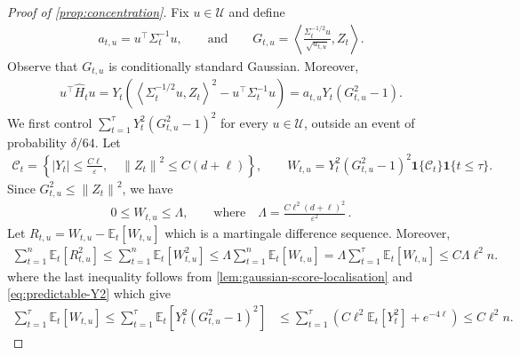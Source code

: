 \documentclass[11pt]{article}
\newcommand{\E}{\mathbb E}
\newcommand{\1}{\mathbf 1}
\newcommand{\eps}{\varepsilon}
\newcommand{\ip}[2]{\left\langle #1,#2\right\rangle}
\newcommand{\norm}[1]{\left\lVert #1\right\rVert}
\begin{document}
\begin{proof}[Proof of \cref{prop:concentration}]
    Fix $u\in\mathcal U$ and define
    \begin{align}
        a_{t,u}
        =
        u^\top\Sigma_t^{-1}u,
        \qquad\text{and}\qquad
        G_{t,u}
        =
        \ip{
            \frac{
                \Sigma_t^{-1/2}u
            }{\sqrt{a_{t,u}}}
        }{Z_t}.
        \label{eq:H-standardisation}
    \end{align}
    Observe that $G_{t,u}$ is conditionally standard Gaussian.  Moreover,
    \begin{align}
        u^\top\widehat H_tu
        =
        Y_t\left(
        \ip{\Sigma_t^{-1/2}u}{Z_t}^2
        -
        u^\top\Sigma_t^{-1}u
        \right)
        =
        a_{t,u}Y_t(G_{t,u}^2-1).
        \label{eq:H-direction}
    \end{align}
    We first control
    $\sum_{t=1}^{\tau} Y_t^2(G_{t,u}^2-1)^2$
    for every $u\in\mathcal U$, outside an event of probability $\delta/64$.
    Let
    \begin{align}
        \mathcal C_t
        =
        \left\{
        |Y_t|\leq\frac{C\ell}{\eps},
        \quad
        \norm{Z_t}^2\leq C(d+\ell)
        \right\},
        \qquad
        W_{t,u}=Y_t^2(G_{t,u}^2-1)^2 \1\{\mathcal C_t\}
        \1\{t\leq\tau\}
        .
    \end{align}
    Since $G_{t,u}^2\leq\norm{Z_t}^2$, we have
    \begin{align}
        0\leq W_{t,u}\leq \Lambda,
        \qquad\text{where}\quad
        \Lambda=\frac{C\ell^2(d+\ell)^2}{\eps^2}\,.
        \label{eq:H-score-energy-increment}
    \end{align}
    Let $R_{t,u}=W_{t,u}-\E_t[W_{t,u}]$ which is a martingale difference sequence.
    Moreover,
    \begin{align}
        \sum_{t=1}^n
        \E_t[R_{t,u}^2]
        \leq
        \sum_{t=1}^n\E_t[W_{t,u}^2]
        \leq
        \Lambda\sum_{t=1}^n\E_t[W_{t,u}]
        =
        \Lambda\sum_{t=1}^{\tau}\E_t[W_{t,u}]
        \leq
        C\Lambda\ell^2n.
    \end{align}
    where the last inequality follows from
    \cref{lem:gaussian-score-localisation} and
    \eqref{eq:predictable-Y2} which give
    \begin{align}
        \sum_{t=1}^\tau
        \E_t[W_{t,u}]
        \leq
        \sum_{t=1}^\tau
        \E_t[Y_t^2(G_{t,u}^2-1)^2]
         & \leq
        \sum_{t=1}^{\tau}
        \left(
        C\ell^2\E_t[Y_t^2]+e^{-4\ell}
        \right)
        \leq C\ell^2n.
        \label{eq:H-score-energy-mean}
    \end{align}

\end{proof}
\end{document}
